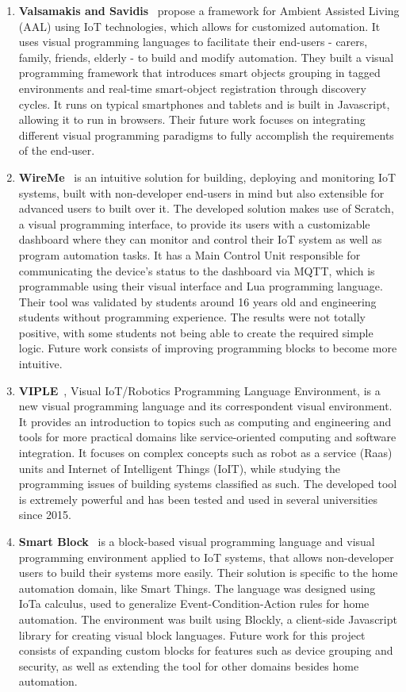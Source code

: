 \begin{enumerate}
    \item \textbf{Valsamakis and Savidis}~\cite{Valsamakis2017} propose a framework for Ambient Assisted Living (AAL) using IoT technologies, which allows for customized automation. It uses visual programming languages to facilitate their end-users - carers, family, friends, elderly - to build and modify automation. They built a visual programming framework that introduces smart objects grouping in tagged environments and real-time smart-object registration through discovery cycles. It runs on typical smartphones and tablets and is built in Javascript, allowing it to run in browsers. Their future work focuses on integrating different visual programming paradigms to fully accomplish the requirements of the end-user.
    \item \textbf{WireMe}~\cite{wireme} is an intuitive solution for building, deploying and monitoring IoT systems, built with non-developer end-users in mind but also extensible for advanced users to built over it. The developed solution makes use of Scratch, a visual programming interface, to provide its users with a customizable dashboard where they can monitor and control their IoT system as well as program automation tasks. It has a Main Control Unit responsible for communicating the device's status to the dashboard via MQTT, which is programmable using their visual interface and Lua programming language. Their tool was validated by students around 16 years old and engineering students without programming experience. The results were not totally positive, with some students not being able to create the required simple logic. Future work consists of improving programming blocks to become more intuitive.
    \item \textbf{VIPLE}~\cite{viple}, Visual IoT/Robotics Programming Language Environment, is a new visual programming language and its correspondent visual environment. It provides an introduction to topics such as computing and engineering and tools for more practical domains like service-oriented computing and software integration. It focuses on complex concepts such as robot as a service (Raas) units and Internet of Intelligent Things (IoIT), while studying the programming issues of building systems classified as such. The developed tool is extremely powerful and has been tested and used in several universities since 2015.
    \item \textbf{Smart Block}~\cite{smart_block} is a block-based visual programming language and visual programming environment applied to IoT systems, that allows non-developer users to build their systems more easily. Their solution is specific to the home automation domain, like Smart Things. The language was designed using IoTa calculus, used to generalize Event-Condition-Action rules for home automation. The environment was built using Blockly, a client-side Javascript library for creating visual block languages. Future work for this project consists of expanding custom blocks for features such as device grouping and security, as well as extending the tool for other domains besides home automation.

\end{enumerate}
